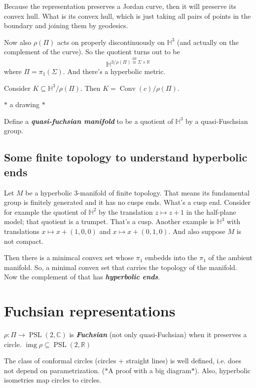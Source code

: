  Because the representation preserves a Jordan curve, then it will preserve its convex hull. What is its convex hull, which is just taking all pairs of points in the boundary and joining them by geodesics.

 Now also $\rho(\Pi)$ acts on properly discontinuously on $\mathbb{H}^{3}$ (and actually on the complement of the curve). So the quotient turns out to be
 \[\mathbb{H}^{3/\rho(\Pi)\overset{\operatorname{dif}}{\cong } \Sigma\times \mathbb{R}}\]
 where $\Pi=\pi_{1}(\Sigma)$. And there's a hyperbolic metric.

 Consider $K\subseteq \mathbb{H}^{3}/\rho(\Pi)$. Then $K=\operatorname{Conv}(c)/\rho(\Pi)$.

 $*$ a drawing $*$

 Define a \textit{\textbf{quasi-fuchsian manifold}} to be a quotient of  $\mathbb{H}^{3}$ by a quasi-Fuschsian group.

 \subsection{Some finite topology to understand hyperbolic ends}
 
 Let $M$ be a hyperbolic 3-manifold of finite topology. That means its fundamental group is finitely generated and it has no cusps ends. What's a cusp end. Consider for example the quotient of $\mathbb{H}^{2}$ by the translation $z\mapsto z+1$ in the half-plane model; that quotient is a trumpet. That's a cusp. Another example is $\mathbb{H}^{3}$ with translations $x\mapsto x+(1,0,0)$ and $x\mapsto x+(0,1,0)$. And also suppose $M$ is not compact.

 Then there is a minimcal convex set whose $\pi_1$ embedds into the $\pi_1$ of the ambient manifold. So, a minimal convex set that carries the topology of the manifold. Now the complement of that has \textit{\textbf{hyperbolic ends}}.

\section{Fuchsian representations}

 $\rho:\Pi\longrightarrow \operatorname{PSL}(2,\mathbb{C})$ is  \textit{\textbf{Fuchsian}} (not only quasi-Fuchsian) when it preserves a circle.  $\operatorname{img} \rho\subseteq \operatorname{PSL}(2,\mathbb{R})$
 
 \begin{remark}\leavevmode
 	The class of conformal circles (circles + straight lines) is well defined, i.e. does not depend on parametrization. ($*$A proof with a big diagram$*$). Also, hyperbolic isometries map circles to circles.
 \end{remark}


